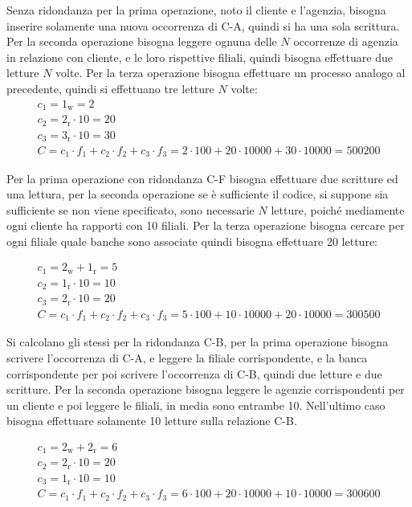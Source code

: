 \documentclass{article}
\numberwithin{equation}{subsection}
\begin{document}
Senza ridondanza per la prima operazione, noto il cliente e l'agenzia, bisogna inserire solamente una nuova occorrenza di C-A, quindi si ha una sola scrittura. Per la seconda operazione bisogna leggere ognuna delle $N$ occorrenze di agenzia in relazione con cliente, e le loro rispettive filiali, quindi bisogna effettuare due letture $N$ volte. Per la terza operazione bisogna effettuare un processo analogo al precedente, quindi si effettuano tre letture $N$ volte:
\begin{gather*}
    c_1=1_\text{w}=2\\
    c_2=2_\text{r}\cdot10=20\\
    c_3=3_\text{r}\cdot10=30\\
    C=c_1\cdot f_1+c_2\cdot f_2+c_3\cdot f_3=2\cdot100+20\cdot10000+30\cdot10000=500200
\end{gather*}



Per la prima operazione con ridondanza C-F bisogna effettuare due scritture ed una lettura, per la seconda operazione se è sufficiente il codice, si suppone sia 
sufficiente se non viene specificato, sono necessarie $N$ letture, poiché mediamente ogni cliente ha rapporti con 10 filiali. Per la terza operazione bisogna 
cercare per ogni filiale quale banche sono associate quindi bisogna effettuare 20 letture:

\begin{gather*}
    c_1=2_\text{w}+1_\text{r}=5\\
    c_2=1_\text{r}\cdot10=10\\
    c_3=2_\text{r}\cdot10=20\\
    C=c_1\cdot f_1+c_2\cdot f_2+c_3\cdot f_3=5\cdot100+10\cdot10000+20\cdot10000=300500
\end{gather*}

Si calcolano gli stessi per la ridondanza C-B, per la prima operazione bisogna scrivere l'occorrenza di C-A, e leggere la filiale corrispondente, e la banca corrispondente 
per poi scrivere l'occorrenza di C-B, quindi due letture e due scritture. Per la seconda operazione bisogna leggere le agenzie corrispondenti per un cliente e poi leggere 
le filiali, in media sono entrambe 10. Nell'ultimo caso bisogna effettuare solamente 10 letture sulla relazione C-B. 

\begin{gather*}
    c_1=2_\text{w}+2_\text{r}=6\\
    c_2=2_\text{r}\cdot10=20\\
    c_3=1_\text{r}\cdot10=10\\
    C=c_1\cdot f_1+c_2\cdot f_2+c_3\cdot f_3=6\cdot100+20\cdot10000+10\cdot10000=300600
\end{gather*}
\end{document}
